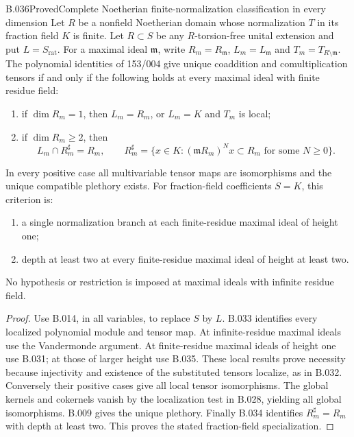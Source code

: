\begin{saresult}{B.036}{Proved}{Complete Noetherian finite-normalization classification in every dimension}
Let $R$ be a nonfield Noetherian domain whose normalization $T$
in its fraction field $K$ is finite. Let $R\subset S$ be any
$R$-torsion-free unital extension and put $L=S_{\mathrm{rat}}$.
For a maximal ideal $\mathfrak m$, write $R_m=R_{\mathfrak m}$,
$L_m=L_{\mathfrak m}$ and $T_m=T_{R\setminus\mathfrak m}$.
The polynomial identities of 153/004 give unique coaddition and
comultiplication tensors if and only if the following holds
at every maximal ideal with finite residue field:
\begin{enumerate}
\item if $\dim R_m=1$, then $L_m=R_m$, or $L_m=K$ and $T_m$
is local;
\item if $\dim R_m\ge2$, then
\[
 L_m\cap R_m^\sharp=R_m,
 \qquad
 R_m^\sharp=\{x\in K:(\mathfrak mR_m)^Nx\subset R_m
                         \text{ for some }N\ge0\}.
\]
\end{enumerate}
In every positive case all multivariable tensor maps are
isomorphisms and the unique compatible plethory exists.
For fraction-field coefficients $S=K$, this criterion is:
\begin{enumerate}
\item a single normalization branch at each finite-residue
maximal ideal of height one;
\item depth at least two at every finite-residue maximal ideal
of height at least two.
\end{enumerate}
No hypothesis or restriction is imposed at maximal ideals with
infinite residue field.
\end{saresult}
\begin{proof}
Use B.014, in all variables, to replace $S$ by $L$.
B.033 identifies every localized polynomial module and tensor
map. At infinite-residue maximal ideals use the Vandermonde
argument. At finite-residue maximal ideals of height one use
B.031; at those of larger height use B.035.
These local results prove necessity because injectivity and
existence of the substituted tensors localize, as in B.032.
Conversely their positive cases give all local tensor
isomorphisms. The global kernels and cokernels vanish by the
localization test in B.028, yielding all global isomorphisms.
B.009 gives the unique plethory.
Finally B.034 identifies $R_m^\sharp=R_m$ with depth at least
two. This proves the stated fraction-field specialization.
\end{proof}


